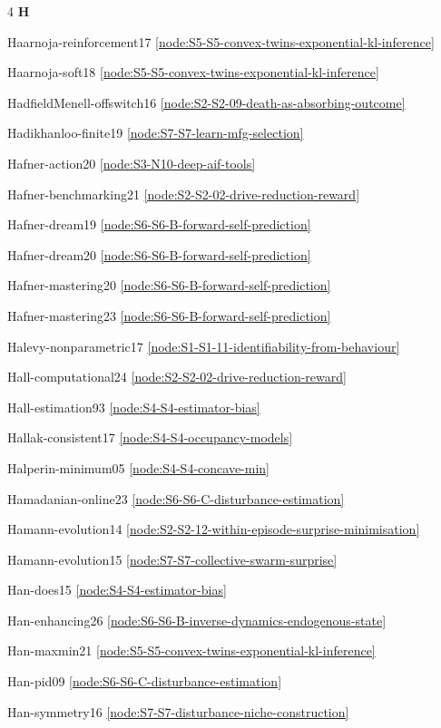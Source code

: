 \documentclass[10pt]{article}
\begin{document}
{\begin{multicols}{4}
\smallskip\textbf{H}\par
Haarnoja-reinforcement17 \hfill \ref{node:S5-S5-convex-twins-exponential-kl-inference}\par
Haarnoja-soft18 \hfill \ref{node:S5-S5-convex-twins-exponential-kl-inference}\par
HadfieldMenell-offswitch16 \hfill \ref{node:S2-S2-09-death-as-absorbing-outcome}\par
Hadikhanloo-finite19 \hfill \ref{node:S7-S7-learn-mfg-selection}\par
Hafner-action20 \hfill \ref{node:S3-N10-deep-aif-tools}\par
Hafner-benchmarking21 \hfill \ref{node:S2-S2-02-drive-reduction-reward}\par
Hafner-dream19 \hfill \ref{node:S6-S6-B-forward-self-prediction}\par
Hafner-dream20 \hfill \ref{node:S6-S6-B-forward-self-prediction}\par
Hafner-mastering20 \hfill \ref{node:S6-S6-B-forward-self-prediction}\par
Hafner-mastering23 \hfill \ref{node:S6-S6-B-forward-self-prediction}\par
Halevy-nonparametric17 \hfill \ref{node:S1-S1-11-identifiability-from-behaviour}\par
Hall-computational24 \hfill \ref{node:S2-S2-02-drive-reduction-reward}\par
Hall-estimation93 \hfill \ref{node:S4-S4-estimator-bias}\par
Hallak-consistent17 \hfill \ref{node:S4-S4-occupancy-models}\par
Halperin-minimum05 \hfill \ref{node:S4-S4-concave-min}\par
Hamadanian-online23 \hfill \ref{node:S6-S6-C-disturbance-estimation}\par
Hamann-evolution14 \hfill \ref{node:S2-S2-12-within-episode-surprise-minimisation}\par
Hamann-evolution15 \hfill \ref{node:S7-S7-collective-swarm-surprise}\par
Han-does15 \hfill \ref{node:S4-S4-estimator-bias}\par
Han-enhancing26 \hfill \ref{node:S6-S6-B-inverse-dynamics-endogenous-state}\par
Han-maxmin21 \hfill \ref{node:S5-S5-convex-twins-exponential-kl-inference}\par
Han-pid09 \hfill \ref{node:S6-S6-C-disturbance-estimation}\par
Han-symmetry16 \hfill \ref{node:S7-S7-disturbance-niche-construction}\par

\end{multicols}}
\end{document}
